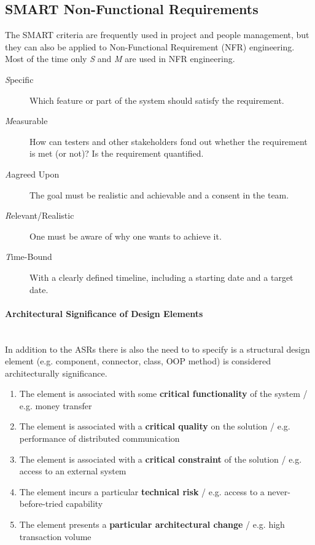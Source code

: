 \subsection{SMART Non-Functional Requirements}
The SMART criteria are frequently used in project and people management, but they can also be applied to Non-Functional Requirement (NFR) engineering. Most of the time only \textit{S} and \textit{M} are used in NFR engineering.

\begin{description}
	\item [\textit{S}pecific] Which feature or part of the system should satisfy the requirement.
	\item [\textit{M}easurable] How can testers and other stakeholders fond out whether the requirement is met (or not)? Is the requirement quantified.
	\item [\textit{A}agreed Upon] The goal must be realistic and achievable and a consent in the team.
	\item [\textit{R}elevant/Realistic] One must be aware of why one wants to achieve it.
	\item [\textit{T}ime-Bound] With a clearly defined timeline, including a starting date and a target date.
\end{description}

\paragraph{Architectural Significance of Design Elements} \hfill \\
In addition to the ASRs there is also the need to to specify is a structural design element (e.g. component, connector, class, OOP method) is considered architecturally significance.

\begin{enumerate}
	\item The element is associated with some \textbf{critical functionality} of the system / e.g. money transfer
	\item The element is associated with a \textbf{critical quality} on the solution / e.g. performance of distributed communication
	\item The element is associated with a \textbf{critical constraint} of the solution / e.g. access to an external system
	\item The element incurs a particular  \textbf{technical risk} / e.g. access to a never-before-tried capability
	\item The element presents a \textbf{particular architectural change} / e.g. high transaction volume
\end{enumerate}


